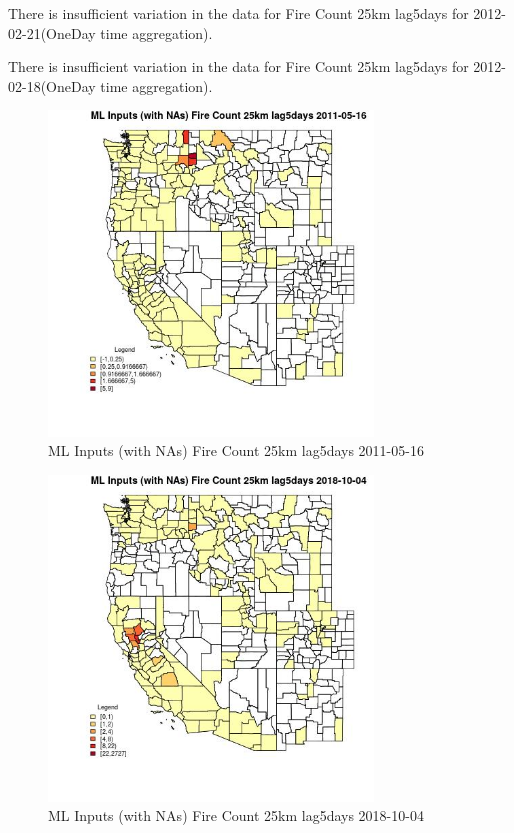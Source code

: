 There is insufficient variation in the data for Fire Count 25km lag5days for 2012-02-21(OneDay time aggregation). 
 

There is insufficient variation in the data for Fire Count 25km lag5days for 2012-02-18(OneDay time aggregation). 
 

\begin{figure} 
\centering  
\includegraphics[width=0.77\textwidth]{Code_Outputs/Report_ML_input_PM25_Step4_part_f_de_duplicated_aves_prioritize_24hr_obswNAs_CountyFire_Count_25km_lag5daysMean2011-05-16.jpg} 
\caption{\label{fig:Report_ML_input_PM25_Step4_part_f_de_duplicated_aves_prioritize_24hr_obswNAsCountyFire_Count_25km_lag5daysMean2011-05-16}ML Inputs (with NAs) Fire Count 25km lag5days 2011-05-16} 
\end{figure} 
 

\begin{figure} 
\centering  
\includegraphics[width=0.77\textwidth]{Code_Outputs/Report_ML_input_PM25_Step4_part_f_de_duplicated_aves_prioritize_24hr_obswNAs_CountyFire_Count_25km_lag5daysMean2018-10-04.jpg} 
\caption{\label{fig:Report_ML_input_PM25_Step4_part_f_de_duplicated_aves_prioritize_24hr_obswNAsCountyFire_Count_25km_lag5daysMean2018-10-04}ML Inputs (with NAs) Fire Count 25km lag5days 2018-10-04} 
\end{figure} 
 

